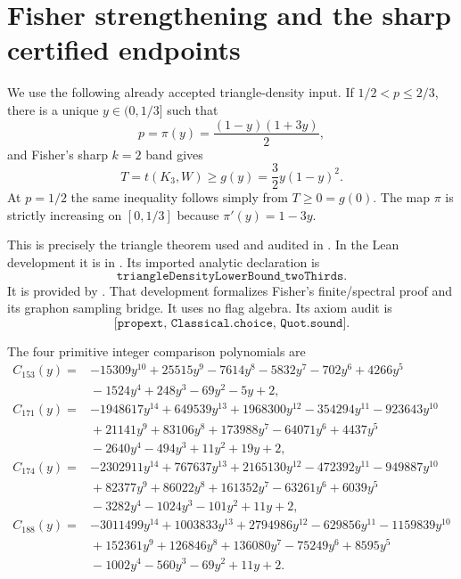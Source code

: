 \documentclass[11pt]{article}
\begin{document}
\section{Fisher strengthening and the sharp certified endpoints}
\label{sec:fisher-comparison}

We use the following already accepted triangle-density input.  If
$1/2<p\leq2/3$, there is a unique $y\in(0,1/3]$ such that
\begin{equation}\label{eq:fisher-parameter}
 p=\pi(y)=\frac{(1-y)(1+3y)}2,
\end{equation}
and Fisher's sharp $k=2$ band gives
\begin{equation}\label{eq:fisher-bound}
 T=t(K_3,W)\geq g(y)=\frac32y(1-y)^2.
\end{equation}
At $p=1/2$ the same inequality follows simply from $T\geq0=g(0)$.
The map $\pi$ is strictly increasing on $[0,1/3]$ because
$\pi'(y)=1-3y$.

This is precisely the triangle theorem used and audited in
.  In the Lean
development it is  in
.
Its imported analytic declaration is
\[
 \texttt{triangleDensityLowerBound\_twoThirds}.
\]
It is provided by .  That development formalizes Fisher's
finite/spectral proof and its graphon sampling bridge.  It uses no flag
algebra.  Its axiom audit is
\[
 \texttt{[propext, Classical.choice, Quot.sound]}.
\]

The four primitive integer comparison polynomials are
\begin{align*}
C_{153}(y)={}&-15309y^{10}+25515y^9-7614y^8-5832y^7-702y^6
 +4266y^5\\
 &{}-1524y^4+248y^3-69y^2-5y+2,\\[2mm]
C_{171}(y)={}&-1948617y^{14}+649539y^{13}+1968300y^{12}
 -354294y^{11}-923643y^{10}\\
 &{}+21141y^9+83106y^8+173988y^7-64071y^6+4437y^5\\
 &{}-2640y^4-494y^3+11y^2+19y+2,\\[2mm]
C_{174}(y)={}&-2302911y^{14}+767637y^{13}+2165130y^{12}
 -472392y^{11}-949887y^{10}\\
 &{}+82377y^9+86022y^8+161352y^7-63261y^6+6039y^5\\
 &{}-3282y^4-1024y^3-101y^2+11y+2,\\[2mm]
C_{188}(y)={}&-3011499y^{14}+1003833y^{13}+2794986y^{12}
 -629856y^{11}-1159839y^{10}\\
 &{}+152361y^9+126846y^8+136080y^7-75249y^6+8595y^5\\
 &{}-1002y^4-560y^3-69y^2+11y+2.
\end{align*}
\end{document}
